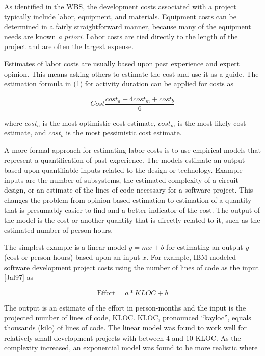 As identified in the WBS, the development costs associated with a
project typically include labor, equipment, and materials. Equipment
costs can be determined in a fairly straightforward manner, because many
of the equipment needs are known \emph{a priori}. Labor costs are tied
directly to the length of the project and are often the largest expense.

Estimates of labor costs are usually based upon past experience and
expert opinion. This means asking others to estimate the cost and use it
as a guide. The estimation formula in (1) for activity duration can be
applied for costs as

\begin{equation}
\label{equ:costEstimateFormula}
Cost \frac{cost_a +4 cost_m + cost_b}{6}
\end{equation}

where $cost_a$ is the most optimistic
cost estimate, $cost_m$ is the most
likely cost estimate, and $cost_b$ is the
most pessimistic cost estimate.

A more formal approach for estimating labor costs is to use empirical
models that represent a quantification of past experience. The models
estimate an output based upon quantifiable inputs related to the design
or technology. Example inputs are the number of subsystems, the
estimated complexity of a circuit design, or an estimate of the lines of
code necessary for a software project. This changes the problem from
opinion-based estimation to estimation of a quantity that is presumably
easier to find and a better indicator of the cost. The output of the
model is the cost or another quantity that is directly related to it,
such as the estimated number of person-hours.

The simplest example is a linear model $y=mx+b$ for estimating an
output $y$ (cost or person-hours) based upon an input $x$. For
example, IBM modeled software development project costs using the number
of lines of code as the input {[}Jal97{]} as

\begin{equation}
\label{equ:softwareEffortIBM}
\text{Effort} = a * KLOC + b
\end{equation}

The output is an estimate of the effort in person-months and the input
is the projected number of lines of code, KLOC. KLOC, pronounced
``kayloc'', equals thousands (kilo) of lines of code. The linear model
was found to work well for relatively small development projects with
between 4 and 10 KLOC. As the complexity increased, an exponential model
was found to be more realistic where

